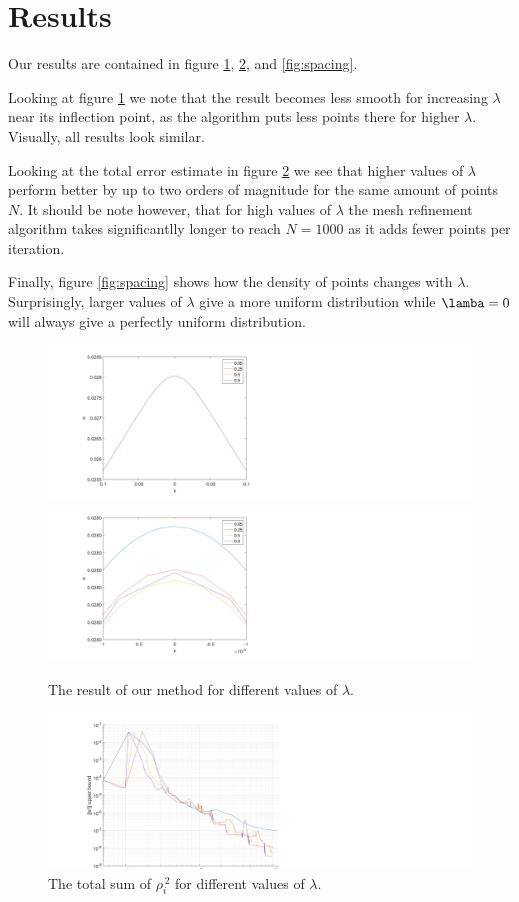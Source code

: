 \section{Results}
Our results are contained in figure \ref{fig:result}, \ref{fig:error}, and \ref{fig:spacing}.
\par Looking at figure \ref{fig:result} we note that the result becomes less smooth for increasing $\lambda$ near its inflection point, as the algorithm puts less points there for higher $\lambda$.
Visually, all results look similar.
\par Looking at the total error estimate in figure \ref{fig:error} we see that higher values of $\lambda$ perform better by up to two orders of magnitude for the same amount of points $N$. It should be note however, that for high values of $\lambda$ the mesh refinement algorithm takes significantlly longer to reach $N=1000$ as it adds fewer points per iteration.
\par Finally, figure \ref{fig:spacing} shows how the density of points changes with $\lambda$. Surprisingly, larger values of $\lambda$ give a more uniform distribution while $\lamba = 0$ will always give a perfectly uniform distribution.
\begin{figure}
\centering
\includegraphics[width=2\textwidth]{figures/result}
\includegraphics[width=2\textwidth]{figures/zoom}
\caption{The result of our method for different values of $\lambda$.}
\label{fig:result}
\end{figure}

\begin{figure}
\centering
\includegraphics[width=1.5\textwidth]{figures/error}
\caption{The total sum of $\rho_i^{\,2}$ for different values of $\lambda$.}
\label{fig:error}
\end{figure}

